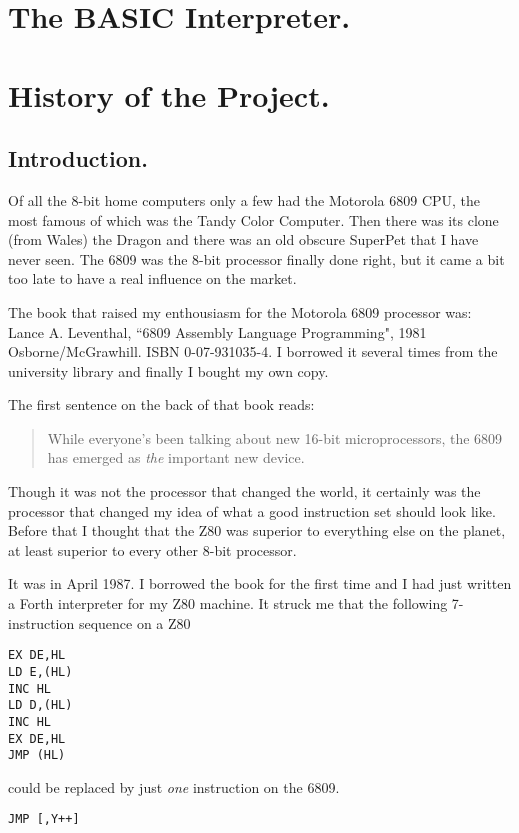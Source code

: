 \chapter{The BASIC Interpreter.}

\chapter{History of the Project.}

\section{Introduction.}

Of all the 8-bit home computers only a few had the Motorola 6809 CPU, the
most famous of which was the Tandy Color Computer. Then there was its clone
(from Wales) the Dragon and there was an old obscure SuperPet that I have
never seen. The 6809 was the 8-bit processor finally done right, but it came
a bit too late to have a real influence on the market. 

The book that raised my enthousiasm for the Motorola 6809 processor was: 
Lance A. Leventhal, ``6809 Assembly Language Programming", 1981
Osborne/McGrawhill. ISBN 0-07-931035-4. I borrowed it several times from the
university library and finally I bought my own copy.

The first sentence on the back of that book reads:
\begin{quote}
While everyone's been talking about new 16-bit microprocessors, the 6809 has
emerged as {\em the} important new device.
\end{quote}

Though it was not the processor that changed the world, it certainly was the
processor that changed my idea of what a good instruction set should look
like. Before that I thought that the Z80 was superior to everything else on
the planet, at least superior to every other 8-bit processor. 

It was in April 1987. I borrowed the book for the first time and I had just
written a Forth interpreter for my Z80 machine. It struck me that the
following 7-instruction sequence on a Z80   
\begin{verbatim}
EX DE,HL
LD E,(HL)
INC HL
LD D,(HL)
INC HL
EX DE,HL
JMP (HL)
\end{verbatim}

could be replaced by just {\em one} instruction on the 6809.
\begin{verbatim}
JMP [,Y++]
\end{verbatim}

